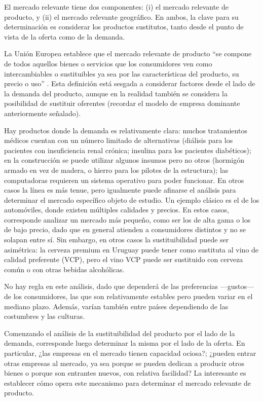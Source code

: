 \documentclass[
  12pt,
  spanish,
]{book}
\begin{document}
El mercado relevante tiene dos componentes: (i) el mercado relevante de producto, y (ii) el mercado relevante geográfico. En ambos, la clave para su determinación es considerar los productos sustitutos, tanto desde el
punto de vista de la oferta como de la demanda.

La Unión Europea establece que el mercado relevante de producto ``se compone de todos aquellos bienes o servicios que los consumidores ven como intercambiables o sustituibles ya sea por las características del producto, su precio
o uso'' \citep{UE1997}. Esta definición está sesgada a considerar factores desde el lado de la demanda del producto, aunque en la realidad también se considera la posibilidad de sustituir oferentes (recordar el modelo de empresa dominante anteriormente señalado).

Hay productos donde la demanda es relativamente clara: muchos tratamientos médicos cuentan con un número limitado de alternativas (diálisis para los pacientes con insuficiencia renal crónica; insulina para los pacientes diabéticos); en la construcción se puede utilizar algunos insumos pero no otros (hormigón armado en vez de madera, o hierro para los pilotes de la estructura); las computadoras requieren un sistema operativo para poder funcionar. En otros casos la línea es más tenue, pero igualmente puede afinarse el análisis para determinar el mercado específico objeto de estudio. Un ejemplo clásico es el de los automóviles, donde existen múltiples calidades y precios. En estos casos, corresponde analizar un mercado más pequeño, como ser los de alta gama o los de bajo precio, dado que en general atienden a consumidores distintos y no se solapan entre sí. Sin embargo, en otros casos la sustituibilidad puede ser asimétrica: la cerveza premium en Uruguay puede tener como sustituta al vino de calidad preferente (VCP), pero el vino VCP puede ser sustituido con cerveza común o con otras bebidas alcohólicas.

No hay regla en este análisis, dado que dependerá de las preferencias ---gustos--- de los consumidores, las que son relativamente estables pero pueden variar en el mediano plazo. Además, varían también entre países dependiendo de las costumbres y las culturas.

Comenzando el análisis de la sustituibilidad del producto por el lado de la demanda, corresponde luego determinar la misma por el lado de la oferta. En particular, ¿las empresas en el mercado tienen capacidad ociosa?; ¿pueden entrar otras empresas al mercado, ya sea porque se pueden dedican a producir otros bienes o porque son entrantes nuevos, con relativa facilidad? La interesante es establecer cómo opera este mecanismo para determinar el mercado relevante de producto.
\end{document}
